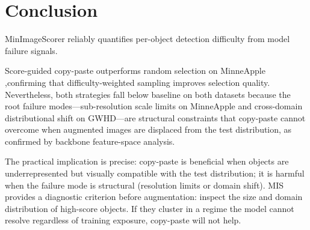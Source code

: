 \documentclass[conference]{IEEEtran}
\begin{document}
\begin{table}[t]
\centering
\caption{Copy-Paste Augmentation results}
\label{tab:ap}
\end{table}

\section{Conclusion}

MinImageScorer reliably quantifies per-object detection difficulty
from model failure signals.

Score-guided copy-paste outperforms random selection on MinneApple
,confirming that difficulty-weighted sampling improves
selection quality.
Nevertheless, both strategies fall below baseline on both datasets
because the root failure modes---sub-resolution scale limits on
MinneApple and cross-domain distributional shift on GWHD---are
structural constraints that copy-paste cannot overcome when
augmented images are displaced from the test distribution,
as confirmed by backbone feature-space analysis.

The practical implication is precise: copy-paste is beneficial
when objects are underrepresented but visually compatible with the
test distribution; it is harmful when the failure mode is
structural (resolution limits or domain shift).
MIS provides a diagnostic criterion before augmentation: inspect
the size and domain distribution of high-score objects.
If they cluster in a regime the model cannot resolve regardless
of training exposure, copy-paste will not help.
\end{document}
